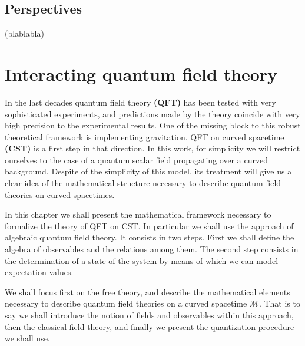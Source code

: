 \documentclass[11pt]{book}
\newcommand{\hilight}[1]{\colorbox{yellow!80!black}{#1}}
\newcommand{\Mcal}{\mathcal{M}}
\theoremstyle{break}
\begin{document}
\section*{Perspectives}


\hilight{(blablabla)}



\chapter{Interacting quantum field theory}
\label{p:INT_QFT}


In the last decades quantum field theory \textbf{(QFT)} has been tested with very sophisticated experiments, and predictions made by the theory coincide with very high precision to the experimental results. One of the missing block to this robust theoretical framework is implementing gravitation. QFT on curved spacetime \textbf{(CST)} is a first step in that direction. In this work, for simplicity we will restrict ourselves to the case of a quantum scalar field propagating over a curved background. Despite of the simplicity of this model, its treatment will give us a clear idea of the mathematical structure necessary to describe quantum field theories on curved spacetimes.


In this chapter we shall present the mathematical framework necessary to formalize the theory of QFT on CST. In particular we shall use the approach of algebraic quantum field theory. It consists in two steps. First we shall define the algebra of observables and the relations among them. The second step consists in the determination of a state of the system by means of which we can model expectation values.


We shall focus first on the free theory, and describe the mathematical elements necessary to describe quantum field theories on a curved spacetime $\Mcal$. That is to say we shall introduce the notion of fields and observables within this approach, then the classical field theory, and finally we present the quantization procedure we shall use.
\end{document}
